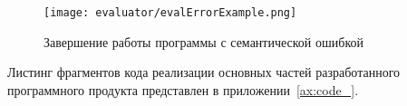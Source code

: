 \begin{figure}[!htb]
	\centering
	\texttt{[image: evaluator/evalErrorExample.png]}
	\caption{Завершение работы программы с семантической ошибкой}
	\label{f:evalErrorExample}
\end{figure}

Листинг фрагментов кода реализации основных частей разработанного программного продукта представлен в приложении~\ref{ax:code_}.